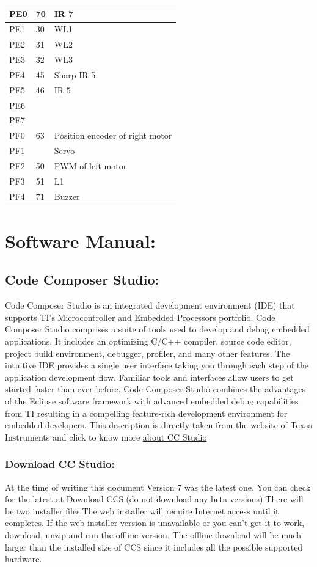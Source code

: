 \documentclass[a4paper,12pt,oneside]{article}
\begin{document}
{\begin{longtable}{|p{}|p{}|p{}|}
			PE0&	70&IR 7\\ \hline
			PE1&	30&	WL1\\ \hline
			PE2&	31&	WL2\\ \hline
			PE3&	32&	WL3\\ \hline
			PE4&	45&	Sharp IR 5\\ \hline
			PE5&	46&	IR 5\\ \hline
			PE6&	&\\ \hline
			PE7&	&	\\ \hline
			
			PF0&	63&	Position encoder of right motor\\ \hline
			PF1&	&	Servo\\ \hline
			PF2&	50&	PWM of left motor\\ \hline
			PF3&	51	&L1\\ \hline
			PF4&	71&	Buzzer\\ \hline
			
		\end{longtable}
	\newpage
	\section{\textbf{Software Manual:}}
		\subsection{ \textbf{Code Composer Studio:}}
			{\large Code Composer Studio is an integrated development environment (IDE) that supports TI's Microcontroller and Embedded Processors portfolio. Code Composer Studio comprises a suite of tools used to develop and debug embedded applications. It includes an optimizing C/C++ compiler, source code editor, project build environment, debugger, profiler, and many other features. The intuitive IDE provides a single user interface taking you through each step of the application development flow. Familiar tools and interfaces allow users to get started faster than ever before. Code Composer Studio combines the advantages of the Eclipse software framework with advanced embedded debug capabilities from TI resulting in a compelling feature-rich development environment for embedded developers. This description is directly taken from the website of Texas Instruments and click to know more	\href{http://www.ti.com/tool/ccstudio}{about CC Studio}}}%
			\subsubsection{\Large\textbf{Download CC Studio:}}
			{\large At the time of writing this document Version 7 was the latest one. You can check for the latest at \href{http://processors.wiki.ti.com/index.php/Download_CCS}{Download CCS}.(do not download
				any beta versions).There will be two installer files.The web installer will require Internet access until it	completes. If the web installer version is unavailable or you can’t get it to work,
				download, unzip and run the offline version. The offline download will be much larger
				than the installed size of CCS since it includes all the possible supported hardware.}
\end{document}
